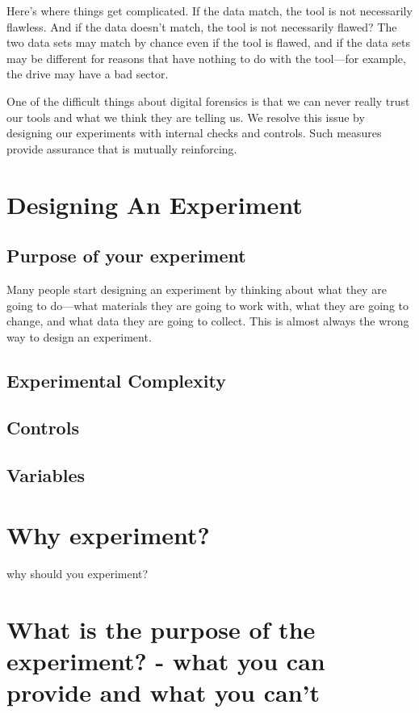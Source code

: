 {Here's where things get complicated. If the data match, the tool is
not necessarily flawless. And if the data doesn't match, the tool
is not necessarily flawed? The two data sets may match by chance even
if the tool is flawed, and if the data sets may be different for
reasons that have nothing to do with the tool---for example, the drive
may have a bad sector. 

One of the difficult things about digital forensics is that we
can never really trust our tools and what we think they are telling
us. We resolve this issue by designing our experiments with internal
checks and controls. Such measures provide assurance that is mutually reinforcing.

\section{Designing An Experiment}


\subsection{Purpose of your experiment}

Many people start designing an experiment by thinking about what they
are going to do---what materials they are going to work with, what they are going to
change, and what data they are going to collect. This is almost always
the wrong way to design an experiment.

\subsection{Experimental Complexity}

\subsection{Controls}

\subsection{Variables}

\section{Why experiment?}

why should you experiment?

\section{What is the purpose of the experiment? - what you can provide and what you can't}
}
